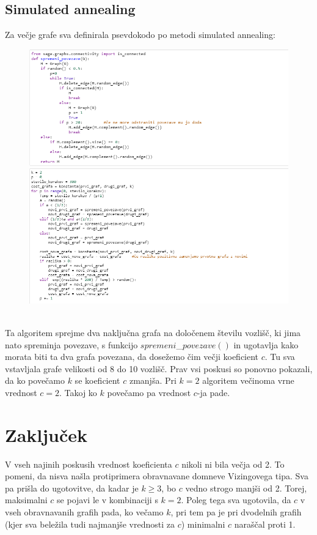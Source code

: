 \documentclass[12pt, a4paper]{article}
\begin{document}
\subsection{Simulated annealing}
Za večje grafe sva definirala psevdokodo po metodi simulated annealing:
\begin{figure}[h!]
\centering
\includegraphics[width=13.5cm]{slika_2}
\includegraphics[width=13.5cm]{slika_3}
\end{figure} \\
Ta algoritem sprejme dva naključna grafa na določenem številu vozlišč, ki jima nato spreminja povezave, s funkcijo $spremeni$\_$povezave()$ in ugotavlja kako morata biti ta dva grafa povezana, da dosežemo čim večji koeficient $c$. Tu sva vstavljala grafe velikosti od 8 do 10 vozlišč. Prav vsi poskusi so ponovno pokazali, da ko povečamo $k$ se koeficient $c$ zmanjša. Pri $k=2$ algoritem večinoma vrne vrednost $c=2$. Takoj ko $k$ povečamo pa vrednost $c$-ja pade. 

\section{Zaključek}
V vseh najinih poskusih vrednost koeficienta $c$ nikoli ni bila večja od 2. To pomeni, da nisva našla protiprimera obravnavane domneve Vizingovega tipa. Sva pa prišla do ugotovitve, da kadar je $k \geq 3$, bo $c$ vedno strogo manjši od 2. Torej, maksimalni $c$ se pojavi le v kombinaciji s $k=2$. Poleg tega sva ugotovila, da $c$ v vseh obravnavanih grafih pada, ko večamo $k$, pri tem pa je pri dvodelnih grafih (kjer sva beležila tudi najmanjše vrednosti za $c$) minimalni $c$ naraščal proti 1.
\end{document}
